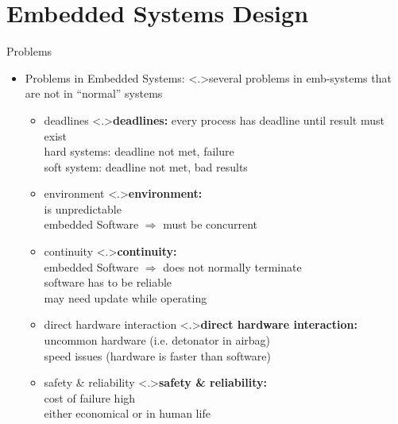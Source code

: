 \documentclass[ngerman={babel}, utf8, bigger, t, xcolor={table,dvipsnames}, ompress, hyperref={bookmarks,colorlinks},red]{beamer}
\begin{document}
\section{Embedded Systems Design}
\begin{frame}{Problems}
	\begin{itemize}
		\item Problems in Embedded Systems:
		\note<.>{several problems in emb-systems that are not in ``normal'' systems}
		\begin{itemize}
			\item deadlines
			\note<.>{\textbf{deadlines:} every process has deadline until result must exist \\ hard systems: deadline not met, failure\\ soft system: deadline not met, bad results}
			\item environment
			\note<.>{\textbf{environment:}\\ is unpredictable \\ embedded Software $\Rightarrow$ must be concurrent}
			\item continuity
			\note<.>{\textbf{continuity:}\\ embedded Software $\Rightarrow$ does not normally terminate \\ software has to be reliable \\ may need update while operating}
			\item direct hardware interaction
			\note<.>{\textbf{direct hardware interaction:}\\ uncommon hardware (i.e. detonator in airbag) \\ speed issues (hardware is faster than software)}
			\item safety \& reliability
			\note<.>{\textbf{safety \& reliability:}\\ cost of failure high \\ either economical or in human life}
		\end{itemize}
	\end{itemize}
\end{frame}
\end{document}
